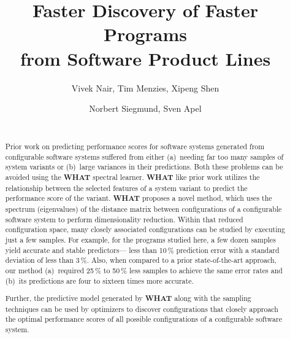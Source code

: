\documentclass{sig-alternative}
\newcommand{\what}{{\bf WHAT }}
\begin{document}
\title{Faster Discovery  of Faster Programs \\from Software Product Lines} 
\author{
        \alignauthor Vivek Nair, Tim Menzies, Xipeng Shen 
    \and  
        \alignauthor Norbert Siegmund, Sven Apel \\
        \\
       }

\maketitle 
\thispagestyle{plain}
\pagestyle{plain}
\begin{abstract}
Prior work on predicting performance scores for software systems generated from
configurable software systems suffered from either (a)~needing far too many samples
of system variants or (b)~large variances in their predictions.
Both these problems can be avoided using the \what spectral learner. \what like prior work utilizes the relationship between the selected features of a system variant to predict the performance score of the variant.  
\what   proposes a novel method, which uses the spectrum (eigenvalues) of the distance matrix
between configurations of a configurable software system to perform dimensionality reduction. Within that
reduced configuration space, many closely associated configurations can be studied
by executing just a few samples. For example, for the programs studied
here, a few dozen samples yield accurate and stable predictors--- less than 10\,\% prediction error with a standard deviation of less than 3\,\%.  
Also, when compared to a prior state-of-the-art approach, our method (a)~required  
25\,\% to 50\,\% less samples to achieve the same error rates
and (b)~its predictions are four to sixteen times more accurate. 

Further, the predictive model generated by
\what along with the sampling techniques can be used by optimizers to discover configurations that closely
approach the optimal performance scores of all possible configurations of a configurable software system.
\end{abstract}
\end{document}

